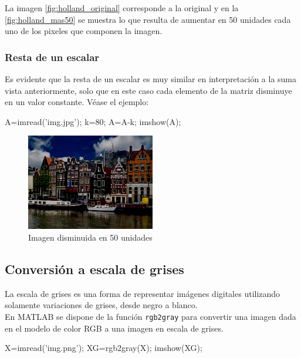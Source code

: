 La imagen \ref{fig:holland_original} corresponde a la original y en
la \ref{fig:holland_mas50} se muestra lo que resulta de aumentar
en 50 unidades cada uno de los pixeles que componen la imagen.

\subsubsection{Resta de un escalar}

Es evidente que la resta de un escalar es muy similar en interpretación
a la suma vista anteriormente, solo que en este caso cada elemento de la
matriz disminuye en un valor constante. Véase el ejemplo:

\begin{matlab}
A=imread('img.jpg');
k=80;
A=A-k;
imshow(A);
\end{matlab}

\begin{figure}[htbp]
    \centering
    \includegraphics[width=0.5\textwidth]{src/img/ch7/holland_menos50.png}
    \caption{Imagen disminuida en 50 unidades}
    \label{fig:holland_menos50}
\end{figure}

\subsection{Conversión a escala de grises}

La escala de grises es una forma de representar imágenes digitales
utilizando solamente variaciones de grises, desde negro a blanco. \\

En MATLAB se dispone de la función \texttt{rgb2gray} para convertir una
imagen dada en el modelo de color RGB a una imagen en escala de grises.

\begin{matlab}
X=imread('img.png');
XG=rgb2gray(X);
imshow(XG);
\end{matlab}



